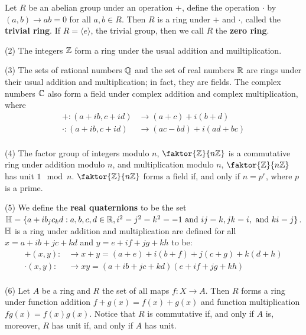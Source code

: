 \begin{example}\label{1.1}
    Let $R$ be an abelian group under an operation $+$, define the operation
    $\cdot$ by  $(a,b) \xrightarrow{} ab=0$ for all $a,b \in R$. Then $R$ is a
    ring under $+$ and  $\cdot$, called the  \textbf{trivial ring}. If
    $R=\langle e \rangle$, the trivial group, then we call $R$ the  \textbf{zero
    ring}.

    \item[(2)] The integers $\mathbb{Z}$ form a ring under the usual addition and
        muiltiplication.

    \item[(3)] The sets of rational numbers $\mathbb{Q}$ and the set of real numbers
        $\mathbb{R}$ are rings under their usual addition and multiplication; in fact,
        they are fields. The complex numbers $\mathbb{C}$ also form a field under
        complex addition and complex multiplication, where
        \begin{align*}
            +:(a+ib,c+id)   &   \xrightarrow{} (a+c)+i(b+d)   \\
            \cdot:(a+ib,c+id)   &   \xrightarrow{} (ac-bd)+i(ad+bc)   \\
        \end{align*}

    \item[(4)] The factor group of integers modulo $n$, $\faktor{\Z}{n\Z}$ is a
        commutative ring under addition modulo $n$, and multiplication modulo
        $n$, $\faktor{\Z}{n\Z}$ has unit $1 \mod{n}$. $\faktor{\Z}{n\Z}$ forms a
        field if, and only if $n=p^r$, where $p$ is a prime.

    \item[(5)] We define the \textbf{real quaternions} to be the set
    $\mathbb{H}=\{a+ib_jc_kd : a,b,c,d \in \mathbb{R}, i^2=j^2=k^2=-1 \text{ and } ij=k,
    jk=i, \text{ and } ki=j\}$. $\mathbb{H}$ is a ring under addition and
    multiplication are defined for all $x=a+ib+jc+kd$ and $y=e+if+jg+kh$ to be:
    \begin{align*}
        +(x,y): &   \xrightarrow{} x+y=(a+e)+i(b+f)+j(c+g)+k(d+h)   \\
        \cdot(x,y):  &   \xrightarrow{} xy= (a+ib+jc+kd)(e+if+jg+kh) \\
    \end{align*}

    \item[(6)] Let $A$ be a ring and $R$ the set of all maps $f:X \xrightarrow{}
        A$. Then $R$ forms a ring under function addition  $f+g(x)=f(x)+g(x)$ and
        function multiplication $fg(x)=f(x)g(x)$. Notice that $R$ is commutative if,
        and only if  $A$ is, moreover,  $R$ has unit if, and only if  $A$ has unit.


\end{example}

